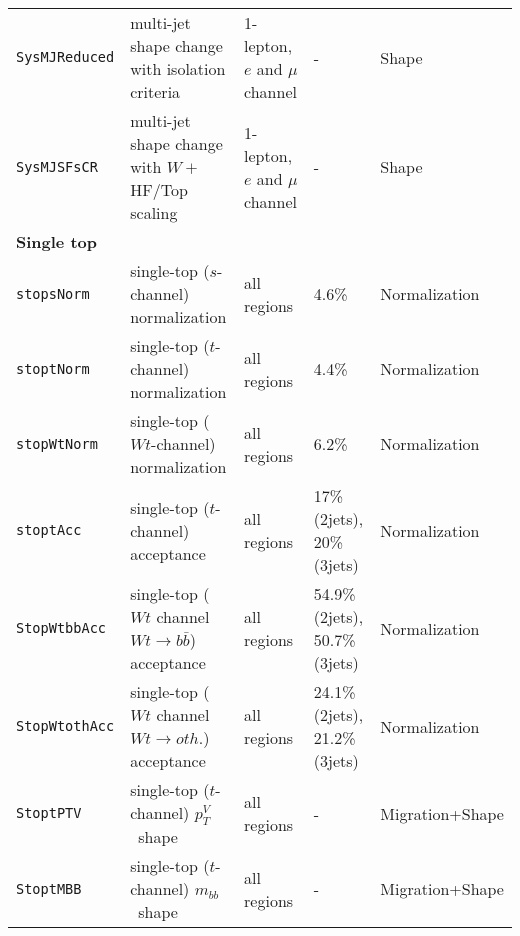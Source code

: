 \begin{table}
{\begin{tabular}{lllll}
      \texttt{SysMJReduced} & multi-jet shape change with isolation criteria & 1-lepton, $e$ and $\mu$ channel & - & Shape \\
      \texttt{SysMJSFsCR} & multi-jet shape change with $W +$HF/Top scaling & 1-lepton, $e$ and $\mu$ channel & - & Shape \\
      {\bfseries Single top}&&&&\\
      \texttt{stopsNorm}    & single-top ($s$-channel) normalization 	&  all regions	& 4.6\%	&Normalization\\
      \texttt{stoptNorm}    & single-top ($t$-channel) normalization 	&  all regions	& 4.4\%	&Normalization\\
      \texttt{stopWtNorm}   & single-top ($Wt$-channel) normalization &  all regions	& 6.2\%	&Normalization\\
      \texttt{stoptAcc}     & single-top ($t$-channel) acceptance 	&  all regions & 17\% (2jets), 20\% (3jets)	&Normalization\\
      \texttt{StopWtbbAcc} 	& single-top ($Wt$ channel $Wt\rightarrow b\bar{b}$) acceptance &  all regions	& 54.9\% (2jets), 50.7\% (3jets)	&Normalization\\
      \texttt{StopWtothAcc} 	& single-top ($Wt$ channel $Wt\rightarrow oth.$) acceptance &  all regions	& 24.1\% (2jets), 21.2\% (3jets)	&Normalization\\
      \texttt{StoptPTV} & single-top ($t$-channel) $p_T^V$\ shape & all regions & - & Migration+Shape\\
      \texttt{StoptMBB} & single-top ($t$-channel) $m_{bb}$\ shape & all regions & - & Migration+Shape\\

\end{tabular}}
\end{table}
